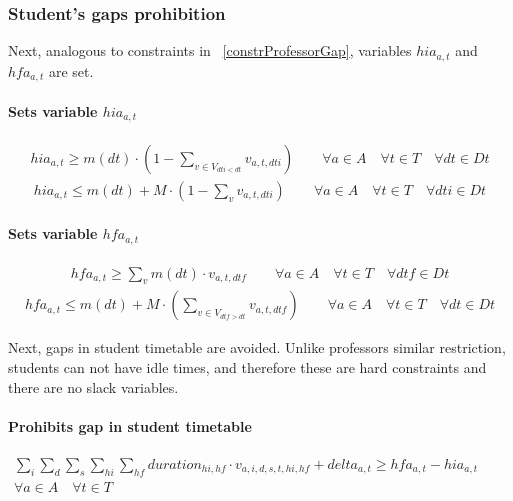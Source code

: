 \subsubsection{Student's gaps prohibition}
\label{constrStudentGap}

Next, analogous to constraints in ~\ref{constrProfessorGap}, variables $hia_{a,t}$ and $hfa_{a,t}$ are set.

\paragraph{Sets variable $hia_{a,t}$}
\begin{eqnarray}
hia_{a,t} \geq m(dt) \cdot ( 1 - \sum\limits_{v \in V_{dti<dt}} v_{a,t,dti} ) \nonumber \qquad
\forall a \in A \quad
\forall t \in T \quad
\forall dt \in Dt
\end{eqnarray}
\begin{eqnarray}
hia_{a,t} \leq m(dt) + M \cdot ( 1 - \sum\limits_{v} v_{a,t,dti} ) \nonumber \qquad
\forall a \in A \quad
\forall t \in T \quad
\forall dti \in Dt
\end{eqnarray}

\paragraph{Sets variable $hfa_{a,t}$}
\begin{eqnarray}
hfa_{a,t} \geq \sum\limits_{v} m(dt) \cdot v_{a,t,dtf} \nonumber \qquad
\forall a \in A \quad
\forall t \in T \quad
\forall dtf \in Dt
\end{eqnarray}
\begin{eqnarray}
hfa_{a,t} \leq m(dt) + M \cdot ( \sum\limits_{v \in V_{dtf>dt}} v_{a,t,dtf} ) \nonumber \qquad
\forall a \in A \quad
\forall t \in T \quad
\forall dt \in Dt
\end{eqnarray}

Next, gaps in student timetable are avoided. Unlike professors similar restriction, students can not have idle times, and therefore these are hard constraints and there are no slack variables.

\paragraph{Prohibits gap in student timetable}
\begin{eqnarray}
\sum\limits_{i} \sum\limits_{d} \sum\limits_{s} \sum\limits_{hi} \sum\limits_{hf} duration_{hi,hf} \cdot v_{a,i,d,s,t,hi,hf} + delta_{a,t} \geq hfa_{a,t} - hia_{a,t} \nonumber \qquad
\\
\forall a \in A \quad
\forall t \in T \quad
\end{eqnarray}





